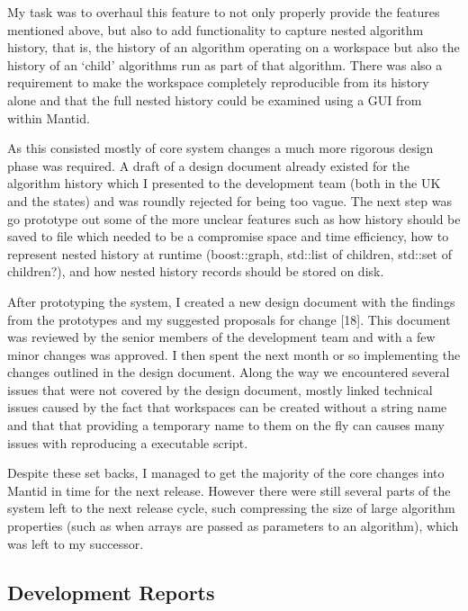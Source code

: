\documentclass[paper=a4, fontsize=11pt]{scrartcl}	%
\numberwithin{equation}{section}															%
\numberwithin{figure}{section}																%
\numberwithin{table}{section}
\begin{document}
My task was to overhaul this feature to not only properly provide the
features mentioned above, but also to add functionality to capture
nested algorithm history, that is, the history of an algorithm operating
on a workspace but also the history of an `child' algorithms run as part
of that algorithm. There was also a requirement to make the workspace
completely reproducible from its history alone and that the full nested
history could be examined using a GUI from within Mantid.

As this consisted mostly of core system changes a much more rigorous
design phase was required. A draft of a design document already existed
for the algorithm history which I presented to the development team
(both in the UK and the states) and was roundly rejected for being too
vague. The next step was go prototype out some of the more unclear
features such as how history should be saved to file which needed to be
a compromise space and time efficiency, how to represent nested history
at runtime (boost::graph, std::list of children, std::set of children?),
and how nested history records should be stored on disk.

After prototyping the system, I created a new design document with the
findings from the prototypes and my suggested proposals for change
{[}18{]}. This document was reviewed by the senior members of the
development team and with a few minor changes was approved. I then spent
the next month or so implementing the changes outlined in the design
document. Along the way we encountered several issues that were not
covered by the design document, mostly linked technical issues caused by
the fact that workspaces can be created without a string name and that
that providing a temporary name to them on the fly can causes many
issues with reproducing a executable script.

Despite these set backs, I managed to get the majority of the core
changes into Mantid in time for the next release. However there were
still several parts of the system left to the next release cycle, such
compressing the size of large algorithm properties (such as when arrays
are passed as parameters to an algorithm), which was left to my
successor.

\subsection{Development Reports}\label{development-reports}
\end{document}

